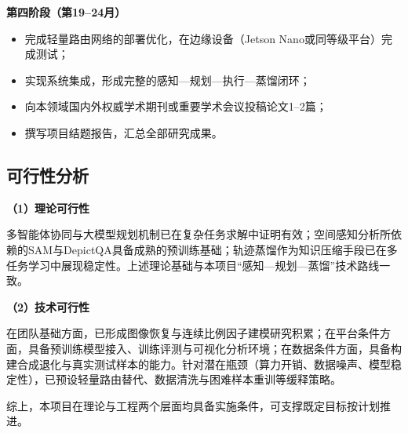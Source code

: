 \textbf{第四阶段（第19–24月）}

\begin{itemize}
\item 完成轻量路由网络的部署优化，在边缘设备（Jetson Nano或同等级平台）完成测试；
\item 实现系统集成，形成完整的感知—规划—执行—蒸馏闭环；
\item 向本领域国内外权威学术期刊或重要学术会议投稿论文1–2篇；
\item 撰写项目结题报告，汇总全部研究成果。
\end{itemize}

\subsection{可行性分析}

\textbf{（1）理论可行性}

多智能体协同与大模型规划机制已在复杂任务求解中证明有效\cite{agenticir,restoreagent,mair,qagent}；空间感知分析所依赖的SAM\cite{sam}与DepictQA\cite{depictqa}具备成熟的预训练基础；轨迹蒸馏作为知识压缩手段已在多任务学习中展现稳定性。上述理论基础与本项目“感知—规划—蒸馏”技术路线一致。

\textbf{（2）技术可行性}

在团队基础方面，已形成图像恢复与连续比例因子建模研究积累\cite{wu2023tgrs,wu2022cjig,wu2020tgrs}；在平台条件方面，具备预训练模型接入、训练评测与可视化分析环境；在数据条件方面，具备构建合成退化与真实测试样本的能力。针对潜在瓶颈（算力开销、数据噪声、模型稳定性），已预设轻量路由替代、数据清洗与困难样本重训等缓释策略。

综上，本项目在理论与工程两个层面均具备实施条件，可支撑既定目标按计划推进。
